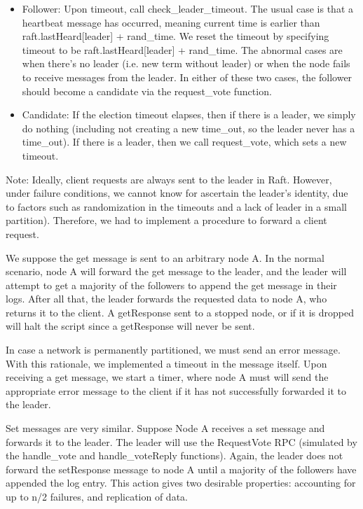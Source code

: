 \documentclass{article}
\begin{document}
\begin{itemize}
\item Follower: Upon timeout, call check\_leader\_timeout. The usual case is that a heartbeat message has occurred, meaning current time is earlier than raft.lastHeard[leader] + rand\_time. We reset the timeout by specifying timeout to be raft.lastHeard[leader] + rand\_time. The abnormal cases are when there’s no leader (i.e. new term without leader) or when the node fails to receive messages from the leader. In either of these two cases, the follower should become a candidate via the request\_vote function.
\item Candidate: If the election timeout elapses, then if there is a leader, we simply do nothing (including not creating a new time\_out, so the leader never has a time\_out). If there is a leader, then we call request\_vote, which sets a new timeout.
\end{itemize}

Note: Ideally, client requests are always sent to the leader in Raft. However, under failure conditions, we cannot know for ascertain the leader’s identity, due to factors such as randomization in the timeouts and a lack of leader in a small partition). Therefore, we had to implement a procedure to forward a client request.

We suppose the get message is sent to an arbitrary node A. In the normal scenario, node A will forward the get message to the leader, and the leader will attempt to get a majority of the followers to append the get message in their logs. After all that, the leader forwards the requested data to node A, who returns it to the client.
A getResponse sent to a stopped node, or if it is dropped will halt the script since a getResponse will never be sent.

In case a network is permanently partitioned, we must send an error message. With this rationale, we implemented a timeout in the message itself. Upon receiving a get message, we start a timer, where node A must will send the appropriate error message to the client if it has not successfully forwarded it to the leader.

Set messages are very similar. Suppose Node A receives a set message and forwards it to the leader. The leader will use the RequestVote RPC (simulated by the handle\_vote and handle\_voteReply functions). Again, the leader does not forward the setResponse message to node A until a majority of the followers have appended the log entry. This action gives two desirable properties: accounting for up to n/2 failures, and replication of data.
\end{document}
